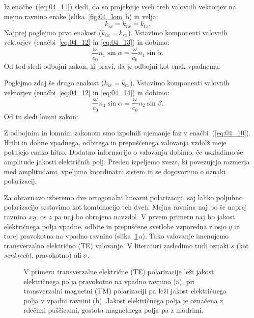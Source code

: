 Iz enačbe~(\ref{eq:04_11}) sledi, da so projekcije vseh treh valovnih vektorjev na mejno
ravnino enake (slika~\ref{fig:04_lom}\,b) in velja:
\begin{equation}
k_{ix} = k_{rx} = k_{tx}.
\label{eq:04_15}
\end{equation}
Najprej poglejmo prvo enakost ($k_{ix} = k_{rx}$). Vstavimo komponenti valovnih
vektorjev (enačbi~\ref{eq:04_12} in \ref{eq:04_13}) in dobimo:
\begin{equation}
\frac{\omega}{c_0} n_1 \sin \alpha  =  \frac{\omega}{c_0} n_1 \sin\tilde{\alpha}.
\label{eq:04_16}
\end{equation}
Od tod sledi odbojni zakon, ki pravi, da je odbojni kot enak vpadnemu:

Poglejmo zdaj še drugo enakost ($k_{ix} = k_{tx}$). Vstavimo komponenti
valovnih vektorjev (enačbi~\ref{eq:04_12} in \ref{eq:04_14}) in dobimo:
\begin{equation}
\frac{\omega}{c_0} n_1 \sin \alpha  = \frac{\omega}{c_0} n_2\sin\beta.
\label{eq:04_17}
\end{equation}
Od tu sledi lomni zakon:

Z odbojnim in lomnim zakonom smo izpolnili ujemanje faz v enačbi~(\ref{eq:04_10}). 
Hribi in doline vpadnega, odbitega in prepuščenega valovanja vzdolž meje 
potujejo enako hitro. Dodatno informacijo o valovanju dobimo, če
uskladimo še amplitude jakosti električnih polj. Preden izpeljemo
zveze, ki povezujejo razmerja med amplitudami, vpeljimo koordinatni sistem
in se dogovorimo o oznaki polarizacij.

Za obravnavo izberemo dve ortogonalni linearni polarizaciji, saj lahko
poljubno polarizacijo sestavimo kot kombinacijo teh dveh.
Mejna ravnina naj bo še naprej ravnina $xy$, os $z$ pa naj bo obrnjena navzdol. 
V prvem primeru naj bo jakost električnega polja
vpadne, odbite in prepuščene svetlobe vzporedna z osjo $y$ in torej pravokotna
na vpadno ravnino (slika~\ref{fig:04_tetm}\,a). 
Tako valovanje imenujemo transverzalno električno (TE) valovanje.
V literaturi zasledimo tudi oznaki $s$ (kot {\it senkrecht}, pravokotno) ali $\sigma$.

\begin{figure}[ht]
\centering
\def\svgwidth{140truemm} 

\caption{V primeru transverzalne električne (TE) polarizacije leži jakost
električnega polja pravokotno na vpadno ravnino (a),
pri transverzalni magnetni (TM) polarizaciji pa leži jakost električnega
polja v vpadni ravnini (b). Jakost električnega polja je označena z rdečimi
puščicami, gostota magnetnega polja pa z modrimi.}
\label{fig:04_tetm}
\end{figure}

